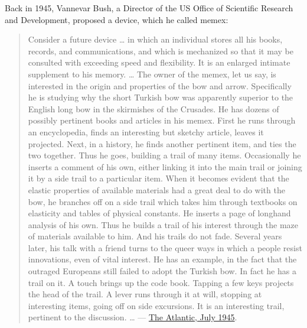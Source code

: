 \documentclass[
]{book}
\begin{document}
Back in 1945, Vannevar Bush, a Director of the US Office of Scientific Research and Development, proposed a device, which he called memex:

\begin{quote}
Consider a future device \ldots{} in which an individual stores all his books, records, and communications, and which is mechanized so that it may be consulted with exceeding speed and flexibility. It is an enlarged intimate supplement to his memory. \ldots{} The owner of the memex, let us say, is interested in the origin and properties of the bow and arrow. Specifically he is studying why the short Turkish bow was apparently superior to the English long bow in the skirmishes of the Crusades. He has dozens of possibly pertinent books and articles in his memex. First he runs through an encyclopedia, finds an interesting but sketchy article, leaves it projected. Next, in a history, he finds another pertinent item, and ties the two together. Thus he goes, building a trail of many items. Occasionally he inserts a comment of his own, either linking it into the main trail or joining it by a side trail to a particular item. When it becomes evident that the elastic properties of available materials had a great deal to do with the bow, he branches off on a side trail which takes him through textbooks on elasticity and tables of physical constants. He inserts a page of longhand analysis of his own. Thus he builds a trail of his interest through the maze of materials available to him. And his trails do not fade. Several years later, his talk with a friend turns to the queer ways in which a people resist innovations, even of vital interest. He has an example, in the fact that the outraged Europeans still failed to adopt the Turkish bow. In fact he has a trail on it. A touch brings up the code book. Tapping a few keys projects the head of the trail. A lever runs through it at will, stopping at interesting items, going off on side excursions. It is an interesting trail, pertinent to the discussion. \ldots{} --- \href{https://www.theatlantic.com/magazine/archive/1945/07/as-we-may-think/303881/}{The Atlantic, July 1945}.
\end{quote}
\end{document}
